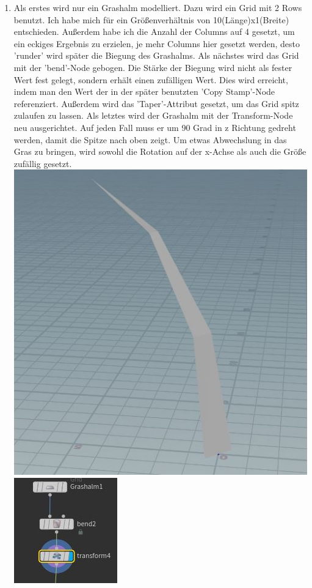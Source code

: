 \documentclass[paper=a4,fontsize=12pt,ngerman]{scrartcl}
\begin{document}
	\begin{enumerate}
		\item Als erstes wird nur ein Grashalm modelliert. Dazu wird ein Grid mit 2 Rows benutzt. Ich habe mich für ein Größenverhältnis von 10(Länge)x1(Breite) entschieden. Außerdem habe ich die Anzahl der Columns auf 4 gesetzt, um ein eckiges Ergebnis zu erzielen, je mehr Columns hier gesetzt werden, desto 'runder' wird später die Biegung des Grashalms. Als nächstes wird das Grid mit der 'bend'-Node gebogen. Die Stärke der Biegung wird nicht als fester Wert fest gelegt, sondern erhält einen zufälligen Wert. Dies wird erreicht, indem man den Wert der in der später benutzten 'Copy Stamp'-Node referenziert. Außerdem wird das 'Taper'-Attribut gesetzt, um das Grid spitz zulaufen zu lassen. Als letztes wird der Grashalm mit der Transform-Node neu ausgerichtet. Auf jeden Fall muss er um 90 Grad in z Richtung gedreht werden, damit die Spitze nach oben zeigt. Um etwas Abwechslung in das Gras zu bringen, wird sowohl die Rotation auf der x-Achse als auch die Größe zufällig gesetzt. \\
		\includegraphics*[scale=0.47]{graphics/grass_3.jpg}
		\includegraphics*[scale=1.4]{graphics/grass_2.jpg}

\end{enumerate}
\end{document}
